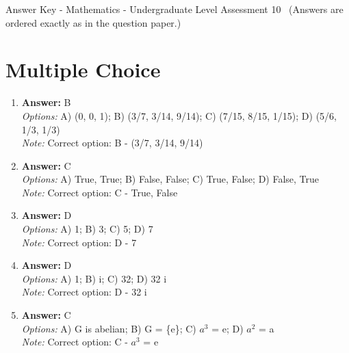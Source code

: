 \documentclass[12pt]{article}
\begin{document}
\begin{center}
Answer Key - Mathematics - Undergraduate Level Assessment 10 \
\small (Answers are ordered exactly as in the question paper.)
\end{center}

\section*{Multiple Choice}
\begin{enumerate}[label=\arabic*.]
\item \textbf{Answer:} B
\\ \textit{Options:} A) (0, 0, 1); B) (3/7, 3/14, 9/14); C) (7/15, 8/15, 1/15); D) (5/6, 1/3, 1/3)
\\ \textit{Note:} Correct option: B - (3/7, 3/14, 9/14)
\item \textbf{Answer:} C
\\ \textit{Options:} A) True, True; B) False, False; C) True, False; D) False, True
\\ \textit{Note:} Correct option: C - True, False
\item \textbf{Answer:} D
\\ \textit{Options:} A) 1; B) 3; C) 5; D) 7
\\ \textit{Note:} Correct option: D - 7
\item \textbf{Answer:} D
\\ \textit{Options:} A) 1; B) i; C) 32; D) 32 i
\\ \textit{Note:} Correct option: D - 32 i
\item \textbf{Answer:} C
\\ \textit{Options:} A) G is abelian; B) G = \{e\}; C) $a^3$ = e; D) $a^2$ = a
\\ \textit{Note:} Correct option: C - $a^3$ = e
\end{enumerate}
\end{document}
